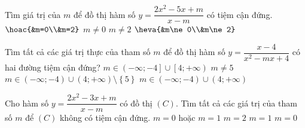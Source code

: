\begin{ex}
	Tìm giá trị của $m$ để đồ thị hàm số $y=\dfrac{2x^2-5x+m}{x-m}$ có tiệm cận đứng.
	\choice
	{$\hoac{&m=0\\&m=2}$}
	{$m\ne 0$}
	{$m\ne 2$}
	{\True $\heva{&m\ne 0\\&m\ne 2}$}
\end{ex} 

\begin{ex}%
	Tìm tất cả các giá trị thực của tham số $m$ để đồ thị hàm số $y=\dfrac{x-4}{x^2-mx+4}$ có hai đường tiệm cận đứng?
	\choice
	{$m \in \left (-\infty;-4\right] \cup \left [4;+\infty \right )$}
	{$m \ne 5$}
	{\True $m \in \left (-\infty;-4\right) \cup \left (4;+\infty \right ) \setminus \left \{5\right \}$}
	{$m \in \left (-\infty;-4\right) \cup \left (4;+\infty \right )$}
\end{ex}
\begin{ex}%
	Cho hàm số $ y = \dfrac{2x^2-3x+m}{x-m} $ có đồ thị $ (C) $. Tìm tất cả các giá trị của tham số $ m $ để $ (C) $ không có tiệm cận đứng.
	\choice
	{\True $ m = 0 $ hoặc $ m = 1 $}
	{$ m = 2 $}
	{$ m = 1 $}
	{$ m = 0 $}
\end{ex}
